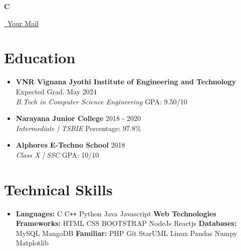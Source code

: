 \documentclass[letterpaper,5pt]{article}
\begin{document}
    \begin{center}
      \textbf{\Huge \scshape C} \\ \vspace{5pt}
      
      \href{mailto:mail@mail.com}{\raisebox{-0.05\height}\faEnvelope \ Your Mail} 
       \
       \
       \
    \end{center}

    
    \section{Education}
    \begin{itemize}
        \item
            \textbf{VNR Vignana Jyothi Institute of Engineering and Technology} \hfill Expected Grad. May 2024 \\
            \textit{B.Tech in Computer Science Engineering} \hfill GPA: 9.50/10
          \vspace*{-2mm}  
        \item
            \textbf{Narayana Junior College} \hfill 2018 - 2020 \\
            \textit{Intermediate | TSBIE} \hfill Percentage: 97.8\%
            \vspace*{-2mm}  
        \item
            \textbf{Alphores E-Techno School} \hfill 2018 \\
            \textit{Class X | SSC} \hfill GPA: 10/10
    \end{itemize}
    \vspace*{-6mm}  
    
    
    \section{Technical Skills}
        \begin{itemize}[leftmargin=0.15in,label={}]
          \item{
            \textbf{Languages: }{C \textbullet{} C\texttt{++} \textbullet{} Python \textbullet{} Java \textbullet{} Javascript \newline}
            \textbf{Web Technologies Frameworks: }{HTML  \textbullet CSS \textbullet{} BOOTSTRAP \textbullet{} NodeJs \textbullet{} Reactjs \newline}
            \textbf{Databases: }{MySQL \textbullet{} MangoDB \newline}
            \textbf{Familiar: }{PHP \textbullet{} Git \textbullet{} StarUML \textbullet{} Linux \textbullet{} Pandas \textbullet{} Numpy \textbullet{} Matplotlib } 
            
          }
          
        \end{itemize}
        \vspace*{-6mm}  
    
\end{document}
